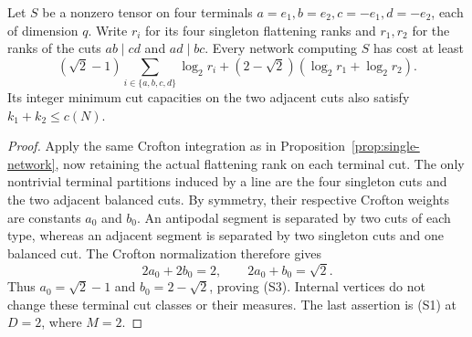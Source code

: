 \begin{lemma}
\label{lem:planar-crofton-profile}
Let $S$ be a nonzero tensor on four terminals
$a=e_1,b=e_2,c=-e_1,d=-e_2$, each of dimension $q$.
Write $r_i$ for its four singleton flattening ranks and
$r_1,r_2$ for the ranks of the cuts $ab\mid cd$ and
$ad\mid bc$.  Every network computing $S$ has cost at least
\[
 (\sqrt2-1)\sum_{i\in\{a,b,c,d\}}\log_2 r_i
 +(2-\sqrt2)(\log_2 r_1+\log_2 r_2).                 \tag{S3}
\]
Its integer minimum cut capacities on the two adjacent cuts
also satisfy $k_1+k_2\le c(N)$.
\end{lemma}
\begin{proof}
Apply the same Crofton integration as in
Proposition~\ref{prop:single-network}, now retaining
the actual flattening rank on each terminal cut.  The only
nontrivial terminal partitions induced by a line are the
four singleton cuts and the two adjacent balanced cuts.
By symmetry, their respective Crofton weights are constants
$a_0$ and $b_0$.  An antipodal segment is separated by two
cuts of each type, whereas an adjacent segment is separated
by two singleton cuts and one balanced cut.  The Crofton
normalization therefore gives
\[
 2a_0+2b_0=2,\qquad 2a_0+b_0=\sqrt2.
\]
Thus $a_0=\sqrt2-1$ and $b_0=2-\sqrt2$, proving (S3).
Internal vertices do not change these terminal cut classes
or their measures.  The last assertion is (S1) at $D=2$,
where $M=2$.
\end{proof}

